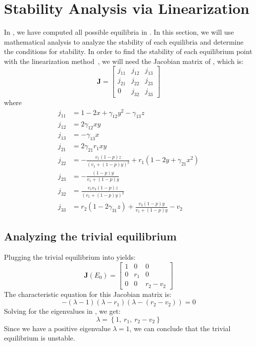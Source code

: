 \section{Stability Analysis via Linearization}\label{sec:stability_analysis}
In , we have computed all possible equilibria in . In this section, we will use mathematical analysis to analyze the stability of each equilibria and determine the conditions for stability. In order to find the stability of each equilibrium point with the linearization method~\cite{book:2478639}, we will need the Jacobian matrix of , which is:
\begin{equation}
    \textbf{J}=\begin{bmatrix}
        j_{11} & j_{12} & j_{13}\\
        j_{21} & j_{22} & j_{23}\\
        0 & j_{32} & j_{33}
    \end{bmatrix}
    \label{eq:5.1}
\end{equation}
where
\begin{align*}
    j_{11} &= 1-2x+\gamma_{12}y^2-\gamma_{13}z\\
    j_{12} &= 2\gamma_{12}xy\\
    j_{13} &= -\gamma_{13}x\\
    j_{21} &= 2\gamma_{21}r_1xy\\
    j_{22} &= -\frac{v_1\left(1-p\right)z}{\left(v_1+\left(1-p\right)y\right)^2}+r_1\left(1-2y+\gamma_{21}x^2\right)\\
    j_{23} &= -\frac{\left(1-p\right)y}{v_1+\left(1-p\right)y}\\
    j_{32} &= \frac{v_1v_3\left(1-p\right)z}{\left(v_1+\left(1-p\right)y\right)^2}\\
    j_{33} &= r_2\left(1-2\gamma_{31}z\right)+\frac{v_3\left(1-p\right)y}{v_1+\left(1-p\right)y}-v_2
\end{align*}

\subsection{Analyzing the trivial equilibrium}\label{subsec:stability_trivial_equilibrium}
Plugging the trivial equilibrium into  yields:
\begin{equation}
    \textbf{J}\left(E_0\right)=\begin{bmatrix}
        1 & 0 & 0\\
        0 & r_1 & 0\\
        0 & 0 & r_2-v_2
    \end{bmatrix}
    \label{eq:5.2}
\end{equation}
The characteristic equation for this Jacobian matrix is:
\begin{equation}
    -\left(\lambda-1\right)\left(\lambda-r_1\right)\left(\lambda-\left(r_2-v_2\right)\right)=0
    \label{eq:5.3}
\end{equation}
Solving for the eigenvalues in , we get:
\[
\lambda=\left\{
1,\
r_1,\
r_2-v_2
\right\}
\]
Since we have a positive eigenvalue $\lambda=1$, we can conclude that the trivial equilibrium is unstable.


